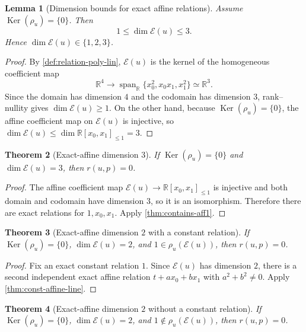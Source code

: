 \documentclass[10pt]{article}
\newtheorem{theorem}{Theorem}[section]
\newtheorem{lemma}[theorem]{Lemma}
\theoremstyle{definition}
\newcommand{\R}{\mathbb{R}}
\newcommand{\Poly}{\R[x_0,x_1]}
\newcommand{\Aff}{\Poly_{\le 1}}
\newcommand{\HomQ}{\operatorname{span}_{\R}\{x_0^2,x_0x_1,x_1^2\}}
\DeclareMathOperator{\kernel}{Ker}
\newcommand{\Ker}{\kernel}
\newcommand{\rel}{\rho}
\newcommand{\Exact}{\mathcal{E}}
\begin{document}
\begin{lemma}[Dimension bounds for exact affine relations]
\label{lem:dim-bounds}
Assume \(\Ker(\rel_u)=\{0\}\). Then
\[
  1\le \dim \Exact(u)\le 3.
\]
Hence \(\dim \Exact(u)\in \{1,2,3\}\).
\end{lemma}

\begin{proof}
By \cref{def:relation-poly-lin}, \(\Exact(u)\) is the kernel of the homogeneous
coefficient map
\[
  \R^4\longrightarrow \HomQ\simeq \R^3.
\]
Since the domain has dimension \(4\) and the codomain has dimension \(3\),
rank--nullity gives \(\dim\Exact(u)\ge 1\). On the other hand, because
\(\Ker(\rel_u)=\{0\}\), the affine coefficient map on \(\Exact(u)\) is
injective, so \(\dim\Exact(u)\le \dim \Aff =3\).
\end{proof}

\begin{theorem}[Exact-affine dimension \(3\)]
\label{thm:exact-dim3}
If \(\Ker(\rel_u)=\{0\}\) and \(\dim \Exact(u)=3\), then \(r(u,p)=0\).
\end{theorem}

\begin{proof}
The affine coefficient map \(\Exact(u)\to \Aff\) is injective and both domain
and codomain have dimension \(3\), so it is an isomorphism. Therefore there are
exact relations for \(1,x_0,x_1\). Apply \cref{thm:contains-aff1}.
\end{proof}

\begin{theorem}[Exact-affine dimension \(2\) with a constant relation]
\label{thm:exact-dim2-const}
If \(\Ker(\rel_u)=\{0\}\), \(\dim \Exact(u)=2\), and \(1\in \rel_u(\Exact(u))\),
then \(r(u,p)=0\).
\end{theorem}

\begin{proof}
Fix an exact constant relation \(1\). Since \(\Exact(u)\) has dimension \(2\),
there is a second independent exact affine relation \(t+a x_0+b x_1\) with
\(a^2+b^2\neq 0\). Apply \cref{thm:const-affine-line}.
\end{proof}

\begin{theorem}[Exact-affine dimension \(2\) without a constant relation]
\label{thm:exact-dim2-noconst}
If \(\Ker(\rel_u)=\{0\}\), \(\dim \Exact(u)=2\), and
\(1\notin \rel_u(\Exact(u))\), then \(r(u,p)=0\).
\end{theorem}
\end{document}
